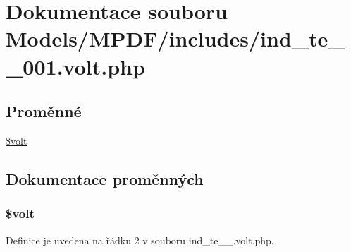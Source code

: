 \hypertarget{ind__te__1__001_8volt_8php}{\section{Dokumentace souboru Models/\-M\-P\-D\-F/includes/ind\-\_\-te\-\_\-\_\-001.volt.\-php}
\label{ind__te__1__001_8volt_8php}
}
\subsection*{Proměnné}
\begin{DoxyCompactItemize}
\item 
\hyperlink{ind__te__1__001_8volt_8php_a013d9bcd621d002433e25a82dd593989}{\$volt}
\end{DoxyCompactItemize}


\subsection{Dokumentace proměnných}
\hypertarget{ind__te__1__001_8volt_8php_a013d9bcd621d002433e25a82dd593989}{
\subsubsection[{\$volt}]{\setlength{\rightskip}{0pt plus 5cm}\$volt}}\label{ind__te__1__001_8volt_8php_a013d9bcd621d002433e25a82dd593989}


Definice je uvedena na řádku 2 v souboru ind\-\_\-te\-\_\-\_.\-volt.\-php.

